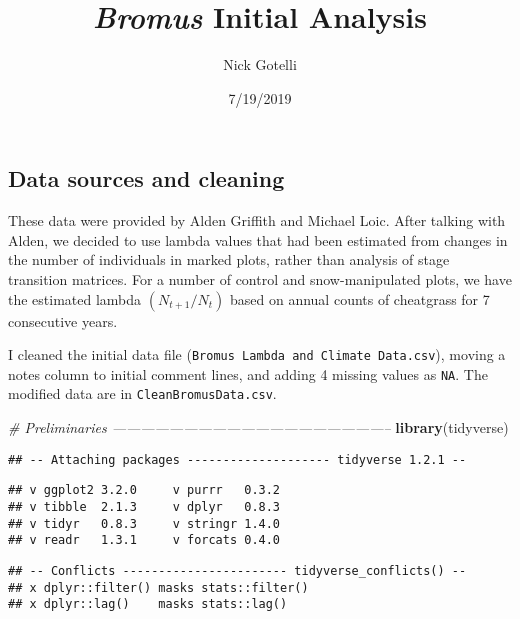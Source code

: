 \documentclass[]{article}
\title{\emph{Bromus} Initial Analysis}
\author{Nick Gotelli}
\date{7/19/2019}
\newenvironment{Shaded}{\begin{snugshade}}{\end{snugshade}}
\newcommand{\CommentTok}[1]{\textcolor[rgb]{0.56,0.35,0.01}{\textit{#1}}}
\newcommand{\KeywordTok}[1]{\textcolor[rgb]{0.13,0.29,0.53}{\textbf{#1}}}
\newcommand{\NormalTok}[1]{#1}
\begin{document}
\maketitle

\hypertarget{data-sources-and-cleaning}{%
\subsection{Data sources and cleaning}\label{data-sources-and-cleaning}}

These data were provided by Alden Griffith and Michael Loic. After
talking with Alden, we decided to use lambda values that had been
estimated from changes in the number of individuals in marked plots,
rather than analysis of stage transition matrices. For a number of
control and snow-manipulated plots, we have the estimated lambda
\((N_{t + 1}/N_{t})\) based on annual counts of cheatgrass for 7
consecutive years.

I cleaned the initial data file
(\texttt{Bromus\ Lambda\ and\ Climate\ Data.csv}), moving a notes column
to initial comment lines, and adding 4 missing values as \texttt{NA}.
The modified data are in \texttt{CleanBromusData.csv}.

\begin{Shaded}
\begin{Highlighting}[]
\CommentTok{# Preliminaries -----------------------------------------------------------}
\KeywordTok{library}\NormalTok{(tidyverse)}
\end{Highlighting}
\end{Shaded}

\begin{verbatim}
## -- Attaching packages -------------------- tidyverse 1.2.1 --
\end{verbatim}

\begin{verbatim}
## v ggplot2 3.2.0     v purrr   0.3.2
## v tibble  2.1.3     v dplyr   0.8.3
## v tidyr   0.8.3     v stringr 1.4.0
## v readr   1.3.1     v forcats 0.4.0
\end{verbatim}

\begin{verbatim}
## -- Conflicts ----------------------- tidyverse_conflicts() --
## x dplyr::filter() masks stats::filter()
## x dplyr::lag()    masks stats::lag()
\end{verbatim}
\end{document}
